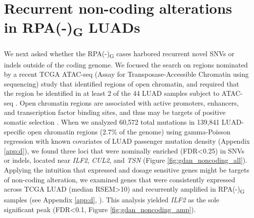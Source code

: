 \documentclass[phd,tocprelim]{cornell}
\begin{document}
\section{Recurrent non-coding alterations in RPA(-)\textsubscript{G} LUADs }
We next asked whether the RPA(-)\textsubscript{G} cases harbored recurrent novel SNVs or indels outside of the coding genome. We focused the search on regions nominated by a recent TCGA ATAC-seq (Assay for Transposase-Accessible Chromatin using sequencing) study that identified regions of open chromatin, and required that the region be identified in at least 2 of the 44 LUAD samples subject to ATAC-seq \cite{Corces2018-nl}. Open chromatin regions are associated with active promoters, enhancers, and transcription factor binding sites, and thus may be targets of positive somatic selection \cite{Fu2014-so,Khurana2016-vj}. When we analyzed 60,572 total mutations in 139,841 LUAD-specific open chromatin regions (2.7\% of the genome) using gamma-Poisson regression with known covariates of LUAD passenger mutation density (Appendix \ref{app:d}), we found three loci that were nominally enriched (FDR<0.25) in SNVs or indels, located near \textit{ILF2}, \textit{CUL2}, and \textit{TSN} (Figure \ref{fig:gdan_noncoding_all}). Applying the intuition that expressed and dosage sensitive genes might be targets of non-coding alteration, we examined genes that were consistently expressed across TCGA LUAD (median RSEM>10) and recurrently amplified in RPA(-)\textsubscript{G} samples (see Appendix \ref{app:d}, \cite{Zack:2013f1f}). This analysis yielded \textit{ILF2} as the sole significant peak (FDR<0.1, Figure \ref{fig:gdan_noncoding_amp}).
\end{document}
